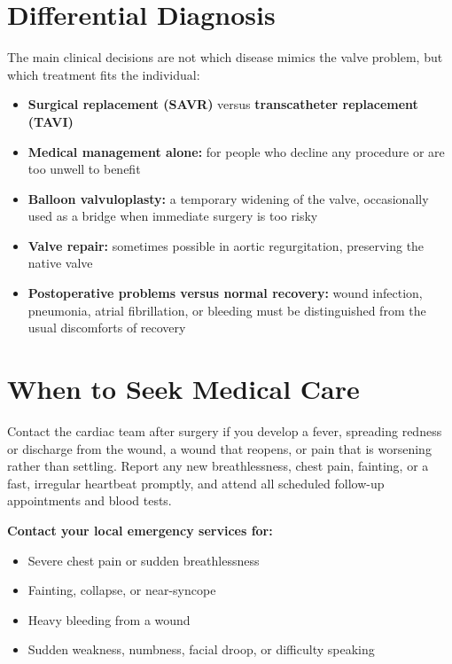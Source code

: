 \section*{Differential Diagnosis}
The main clinical decisions are not which disease mimics the valve problem, but which treatment fits the individual:

\begin{itemize}
    \item \textbf{Surgical replacement (SAVR)} versus \textbf{transcatheter replacement (TAVI)}
    \item \textbf{Medical management alone:} for people who decline any procedure or are too unwell to benefit
    \item \textbf{Balloon valvuloplasty:} a temporary widening of the valve, occasionally used as a bridge when immediate surgery is too risky
    \item \textbf{Valve repair:} sometimes possible in aortic regurgitation, preserving the native valve
    \item \textbf{Postoperative problems versus normal recovery:} wound infection, pneumonia, atrial fibrillation, or bleeding must be distinguished from the usual discomforts of recovery
\end{itemize}

\section*{When to Seek Medical Care}
Contact the cardiac team after surgery if you develop a fever, spreading redness or discharge from the wound, a wound that reopens, or pain that is worsening rather than settling. Report any new breathlessness, chest pain, fainting, or a fast, irregular heartbeat promptly, and attend all scheduled follow-up appointments and blood tests.

\textbf{Contact your local emergency services for:}
\begin{itemize}
    \item Severe chest pain or sudden breathlessness
    \item Fainting, collapse, or near-syncope
    \item Heavy bleeding from a wound
    \item Sudden weakness, numbness, facial droop, or difficulty speaking
\end{itemize}

